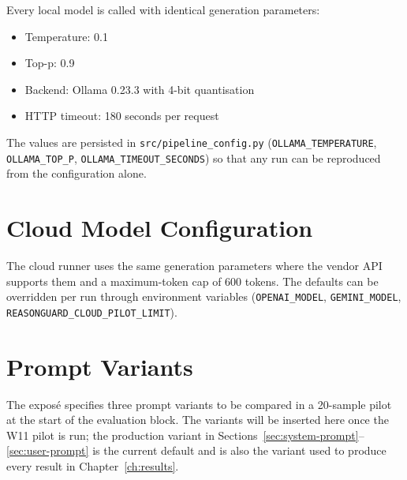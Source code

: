 Every local model is called with identical generation parameters:

\begin{itemize}
  \item Temperature: 0.1
  \item Top-p: 0.9
  \item Backend: Ollama 0.23.3 with 4-bit quantisation
  \item HTTP timeout: 180 seconds per request
\end{itemize}

The values are persisted in
\texttt{src/pipeline\_config.py} (\texttt{OLLAMA\_TEMPERATURE},
\texttt{OLLAMA\_TOP\_P}, \texttt{OLLAMA\_TIMEOUT\_SECONDS}) so that any run
can be reproduced from the configuration alone.

\section{Cloud Model Configuration}
\label{sec:cloud-model-config}

The cloud runner uses the same generation parameters where the vendor API
supports them and a maximum-token cap of 600 tokens. The defaults can be
overridden per run through environment variables
(\texttt{OPENAI\_MODEL}, \texttt{GEMINI\_MODEL},
\texttt{REASONGUARD\_CLOUD\_PILOT\_LIMIT}).

\section{Prompt Variants}
\label{sec:prompt-variants}

The exposé specifies three prompt variants to be compared in a 20-sample
pilot at the start of the evaluation block. The variants will be inserted
here once the W11 pilot is run; the production variant in
Sections~\ref{sec:system-prompt}--\ref{sec:user-prompt} is the current
default and is also the variant used to produce every result in
Chapter~\ref{ch:results}.
